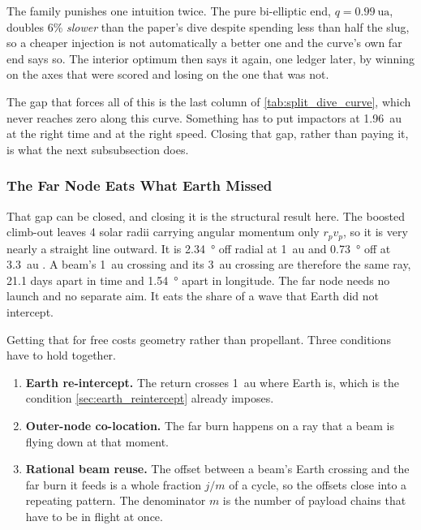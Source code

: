 \documentclass{article}
\begin{document}
The family punishes one intuition twice. The pure bi-elliptic end, $q = \SI{0.99}{\astronomicalunit}$, doubles 6\% \emph{slower} than the paper's dive despite spending less than half the slug, so a cheaper injection is not automatically a better one and the curve's own far end says so. The interior optimum then says it again, one ledger later, by winning on the axes that were scored and losing on the one that was not.

The gap that forces all of this is the last column of \autoref{tab:split_dive_curve}, which never reaches zero along this curve. Something has to put impactors at \SI{1.96}{\astronomicalunit} at the right time and at the right speed. Closing that gap, rather than paying it, is what the next subsubsection does.

\subsubsection{The Far Node Eats What Earth Missed}\label{sec:far_node_colocation}
That gap can be closed, and closing it is the structural result here. The boosted climb-out leaves 4 solar radii carrying angular momentum only $r_p v_p$, so it is very nearly a straight line outward. It is \SI{2.34}{\degree} off radial at \SI{1}{\astronomicalunit} and \SI{0.73}{\degree} off at \SI{3.3}{\astronomicalunit} \cite{Katz_aim_is_all_you_need_2025}. A beam's \SI{1}{\astronomicalunit} crossing and its \SI{3}{\astronomicalunit} crossing are therefore the same ray, \num{21.1} days apart in time and \SI{1.54}{\degree} apart in longitude. The far node needs no launch and no separate aim. It eats the share of a wave that Earth did not intercept.

Getting that for free costs geometry rather than propellant. Three conditions have to hold together.

\begin{enumerate}
    \item \textbf{Earth re-intercept.} The return crosses \SI{1}{\astronomicalunit} where Earth is, which is the condition \autoref{sec:earth_reintercept} already imposes.
    \item \textbf{Outer-node co-location.} The far burn happens on a ray that a beam is flying down at that moment.
    \item \textbf{Rational beam reuse.} The offset between a beam's Earth crossing and the far burn it feeds is a whole fraction $j/m$ of a cycle, so the offsets close into a repeating pattern. The denominator $m$ is the number of payload chains that have to be in flight at once.
\end{enumerate}
\end{document}
